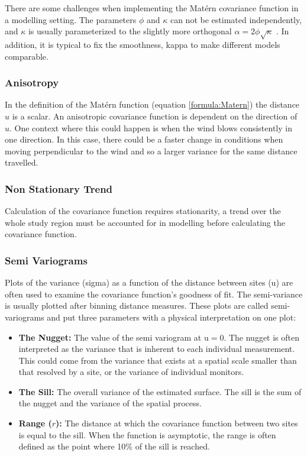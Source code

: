 \documentclass{article}
\begin{document}
There are some challenges when implementing the Mat\'{e}rn covariance function in a modelling setting.  The parameters $\phi$ and $\kappa$ can not be estimated independently, and $\kappa$ is usually parameterized to the slightly more orthogonal $\alpha = 2\phi \sqrt{\kappa}$  \citep{diggle:07}.  In addition, it is typical to fix the smoothness, \gls{kappa} to make different models comparable. 

\subsubsection*{Anisotropy}
\label{subsubsec:anisotropy}
In the definition of the Mat\'{e}rn function (equation \ref{formula:Matern}) the distance $u$ is a scalar.  An anisotropic covariance function is dependent on the direction of $u$.  One context where this could happen is when the wind blows consistently in one direction.  In this case, there could be a faster change in conditions when moving perpendicular to the wind and so a larger variance for the same distance travelled.  

\subsubsection*{Non Stationary Trend}\label{subsubsec:nonstatiomary}
Calculation of the covariance function requires stationarity, a trend over the whole study region must be accounted for in modelling before calculating the covariance function.

\subsubsection*{Semi Variograms}
\label{subsubsec:semivariograms}
Plots of the variance (\gls{sigma}) as a function of the distance between sites (\gls{u}) are often used to examine the covariance function's goodness of fit. The semi-variance is usually plotted after binning distance measures. These plots are called semi-variograms and put three parameters with a physical interpretation on one plot:

\begin{itemize}
    \item \textbf{The Nugget:} The value of the semi variogram at \gls{u}$=0$.  The nugget is often interpreted as the variance that is inherent to each individual measurement.  This could come from the variance that exists at a spatial scale smaller than that resolved by a site, or the variance of individual monitors.
    \item  \textbf{The Sill:} The overall variance of the estimated surface.  The sill is the sum of the nugget and the variance of the spatial process.
    \item \textbf{Range ($r$):} The distance at which the covariance function between two sites is equal to the sill.  When the function is asymptotic, the range is often defined as the point where 10\% of the sill is reached.  
\end{itemize}
\end{document}

